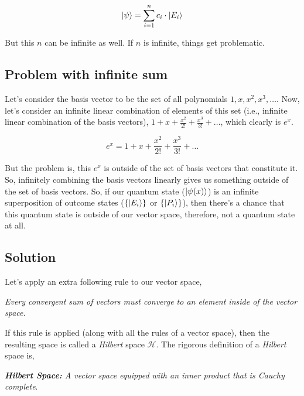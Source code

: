 	\begin{equation}
		\ket{\psi} = \sum_{i=1}^{n} c_i \cdot \ket{E_i}
		\label{eq:3}
	\end{equation}

	\noindent But this $ n $ can be infinite as well. If $ n $
	is infinite, things get problematic.

	\subsection{Problem with infinite sum}
	\noindent Let's consider the basis vector to be the set of all polynomials
	$ {1, x, x^2, x^3,\dots} $. Now, let's consider an infinite linear combination
	of elements of this set (i.e., infinite linear combination of the basis
	vectors), $ 1 + x + \frac{x^2}{2!} + \frac{x^3}{3!} + \dots $, which clearly
	is $ e^x $.

	\begin{equation}
		e^x = 1 + x + \frac{x^2}{2!} + \frac{x^3}{3!} + \dots
		\label{eq:4}
	\end{equation}

	\noindent But the problem is, this $ e^x $ is outside of the set of basis
	vectors that constitute it. So, infinitely combining the basis vectors linearly
	gives us something outside of the set of basis vectors. So, if our quantum
	state ($ \ket{\psi(x)} $) is an infinite superposition of outcome states
	($ \{\ket{E_i}\} $ or $ \{\ket{P_i}\} $), then there's a chance that this quantum state is
	outside of our vector space, therefore, not a quantum state at all. 

	\subsection{Solution}

	\noindent Let's apply an extra following rule to our vector space,
	\begin{center}
		\emph{Every convergent sum of vectors must converge to an element inside
		of the vector space.}
	\end{center}

	\noindent If this rule is applied (along with all the rules of a vector space), then
	the resulting space is called a \emph{Hilbert} space $ \mathcal{H} $. The rigorous 
	definition of a \emph{Hilbert} space is,

	\begin{center}
		\emph{\textbf{Hilbert Space: } A vector space equipped with an \emph{inner product}
		that is \emph{Cauchy complete}}.
	\end{center}

